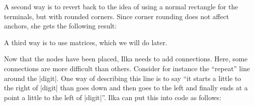 A second way is to revert back to the idea of using a normal rectangle for the
terminals, but with rounded corners. Since corner rounding does not affect
anchors, she gets the following result:
%
\begin{codeexample}[libraries/tikz={positioning,shapes.misc}]
\end{codeexample}
%
A third way is to use matrices, which we will do later.

Now that the nodes have been placed, Ilka needs to add connections. Here, some
connections are more difficult than others. Consider for instance the
``repeat'' line around the |digit|. One way of describing this line is to say
``it starts a little to the right of |digit| than goes down and then goes to
the left and finally ends at a point a little to the left of |digit|''. Ilka
can put this into code as follows:
%
\begin{codeexample}[libraries/tikz={calc,positioning,shapes.misc}]
\end{codeexample}

